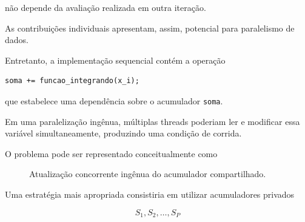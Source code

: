 não depende da avaliação realizada em outra iteração.

As contribuições individuais apresentam, assim, potencial para paralelismo
de dados.

Entretanto, a implementação sequencial contém a operação

\begin{verbatim}
soma += funcao_integrando(x_i);
\end{verbatim}

que estabelece uma dependência sobre o acumulador \texttt{soma}.

Em uma paralelização ingênua, múltiplas threads poderiam ler e modificar
essa variável simultaneamente, produzindo uma condição de corrida.

O problema pode ser representado conceitualmente como

\begin{figure}[htbp]
    \centering

    \caption{Atualização concorrente ingênua do acumulador compartilhado.}
    \label{fig:atvd04-corrida-soma}
\end{figure}

Uma estratégia mais apropriada consistiria em utilizar acumuladores privados

\begin{equation}
    S_1,S_2,\ldots,S_P
\end{equation}

